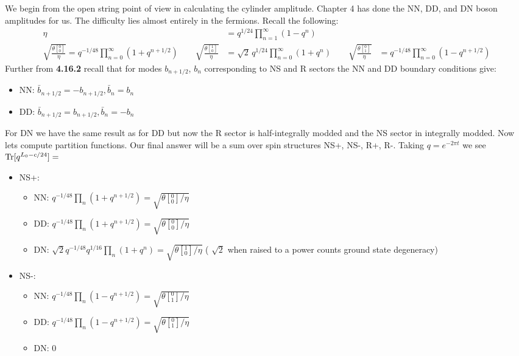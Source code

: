 \documentclass[11pt, class=article, crop=false]{standalone}
\begin{document}
\begin{enumerate}
	We begin from the open string point of view in calculating the cylinder amplitude. Chapter 4 has done the NN, DD, and DN boson amplitudes for us. The difficulty lies almost entirely in the fermions.
	Recall the following:
	\[
	\begin{aligned}
		\eta &= q^{1/24} \prod_{n=1}^\infty (1-q^n)\\
		 \sqrt{\frac{\theta[{^0_0}]}{\eta}} = q^{-1/48} \prod_{n=0}^\infty (1 + q^{n+1/2}) \qquad 
		 \sqrt{\frac{\theta[{^1_0}]}{\eta}} &= \sqrt 2 \, q^{1/24} \prod_{n=0}^\infty (1 + q^n) \qquad  \sqrt{\frac{\theta[{^0_1}]}{\eta}} &= q^{-1/48} \prod_{n=0}^\infty (1 - q^{n+1/2})
	\end{aligned}
	\]
	Further from \textbf{4.16.2} recall that for modes $b_{n+1/2}$, $b_n$ corresponding to NS and R sectors  the NN and DD boundary conditions give:
	\begin{itemize}
		\item NN: $\bar b_{n+1/2} = - b_{n+1/2}, \bar b_n = b_n$
		\item DD: $\bar b_{n+1/2} = b_{n+1/2}, \bar b_n = -b_n$
	\end{itemize}
	For DN we have the same result as for DD but now the R sector is half-integrally modded and the NS sector in integrally modded. Now lets compute partition functions. Our final answer will be a sum over spin structures NS+, NS-, R+, R-. Taking $q = e^{- 2 \pi t}$ we see $\mathrm{Tr}[q^{L_0 - c/24}] = $
	\begin{itemize}
		\item NS+: 
		\begin{itemize}
			\item NN: $q^{-1/48}\prod_{n} (1 + q^{n+1/2}) =  \sqrt{\theta[{^0_0}]/\eta}$
			\item DD: $q^{-1/48}\prod_{n} (1 + q^{n+1/2}) = \sqrt{\theta[{^0_0}]/\eta}$
			\item DN: $\sqrt{2} q^{-1/48} q^{1/16} \prod_{n} (1 + q^{n}) = \sqrt{\theta[{^1_0}]/\eta}$ ( $\sqrt 2$ when raised to a power counts ground state degeneracy)
		\end{itemize}
%
		\item NS-: 
		\begin{itemize}
			\item NN: $q^{-1/48}\prod_{n} (1 - q^{n+1/2}) =  \sqrt{\theta[{^0_1}]/\eta}$
			\item DD: $q^{-1/48}\prod_{n} (1 - q^{n+1/2}) = \sqrt{\theta[{^0_1}]/\eta}$
			\item DN: $0$
		\end{itemize}
		

\end{itemize}
\end{enumerate}
\end{document}
